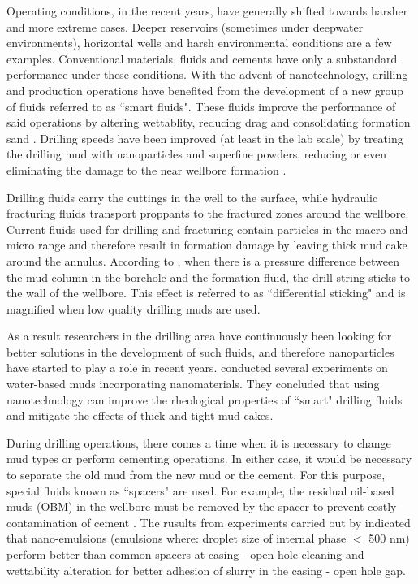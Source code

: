 Operating conditions, in the recent years, have generally shifted towards harsher and more extreme cases. Deeper reservoirs (sometimes under deepwater environments), horizontal wells and harsh environmental conditions are a few examples. Conventional materials, fluids and cements have only a substandard performance under these conditions. With the advent of nanotechnology, drilling and production operations have benefited from the development of a new group of fluids referred to as ``smart fluids". These fluids improve the performance of said operations by altering wettablity, reducing drag and consolidating formation sand \citep{Wasan2003, Chaudhury2003, Amanullah2009}. Drilling speeds have been improved (at least in the lab scale) by treating the drilling mud with nanoparticles and superfine powders, reducing or even eliminating the damage to the near wellbore formation \citep{Esmaeili2011}.

Drilling fluids carry the cuttings in the well to the surface, while hydraulic fracturing fluids transport proppants to the fractured zones around the wellbore. Current fluids used for drilling and fracturing contain particles in the macro and micro range and therefore result in formation damage by leaving thick mud cake around the annulus. According to \citet{Outmans1958}, when there is a pressure difference between the mud column in the borehole and the formation fluid, the drill string sticks to the wall of the wellbore. This effect is referred to as ``differential sticking" and is magnified when low quality drilling muds are used. 

As a result researchers in the drilling area have continuously been looking for better solutions in the development of such fluids, and therefore nanoparticles have started to play a role in recent years. \citet{Amanullah2011} conducted several experiments on water-based muds incorporating nanomaterials. They concluded that using nanotechnology can improve the rheological properties of ``smart" drilling fluids and mitigate the effects of thick and tight mud cakes. 

During drilling operations, there comes a time when it is necessary to change mud types or perform cementing operations. In either case, it would be necessary to separate the old mud from the new mud or the cement. For this purpose, special fluids known as ``spacers" are used. For example, the residual oil-based muds (OBM) in the wellbore must be removed by the spacer to prevent costly contamination of cement \citep{VanZanten2010}. The rusults from experiments carried out by \citet{Maserati2010} indicated that nano-emulsions (emulsions where: droplet size of internal phase $<$ 500 nm) perform better than common spacers at casing - open hole cleaning and wettability alteration for better adhesion of slurry in the casing - open hole gap. 

